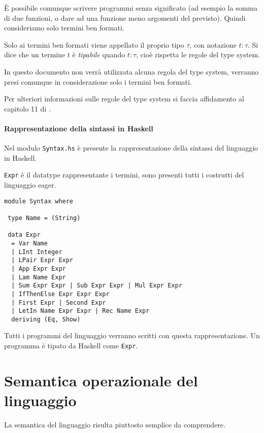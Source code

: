 \documentclass{article}
\begin{document}
È possibile comunque scrivere programmi senza significato (ad esempio la somma di due funzioni, o dare ad una funzione meno argomenti del previsto). Quindi consideriamo solo termini ben formati.

Solo ai termini ben formati viene appellato il proprio tipo $\tau$, con notazione $t: \tau$. Si dice che un termine $t$ è \emph{tipabile} quando $t : \tau $, cioè rispetta le regole del type system.

In questo documento non verrà utilizzata alcuna regola del type system, verranno presi comunque in considerazione solo i termini ben formati.

Per ulteriori informazioni sulle regole del type system si faccia affidamento al capitolo 11 di \cite{Winskel}.%

\paragraph{Rappresentazione della sintassi in Haskell}
Nel modulo \texttt{Syntax.hs} è presente la rappresentazione della sintassi del linguaggio in Haskell.

\texttt{Expr} è il datatype rappresentante i termini, sono presenti tutti i costrutti del linguaggio eager.

\begin{verbatim}
module Syntax where

 type Name = (String) 

 data Expr
  = Var Name
  | LInt Integer
  | LPair Expr Expr
  | App Expr Expr
  | Lam Name Expr
  | Sum Expr Expr | Sub Expr Expr | Mul Expr Expr
  | IfThenElse Expr Expr Expr
  | First Expr | Second Expr
  | LetIn Name Expr Expr | Rec Name Expr
  deriving (Eq, Show)

\end{verbatim}

Tutti i programmi del linguaggio verranno scritti con questa rappresentazione. Un programma è tipato da Haskell come \texttt{Expr}.

\section{Semantica operazionale del linguaggio}
\label{sec:operational}
La semantica del linguaggio risulta piuttosto semplice da comprendere.
\end{document}
